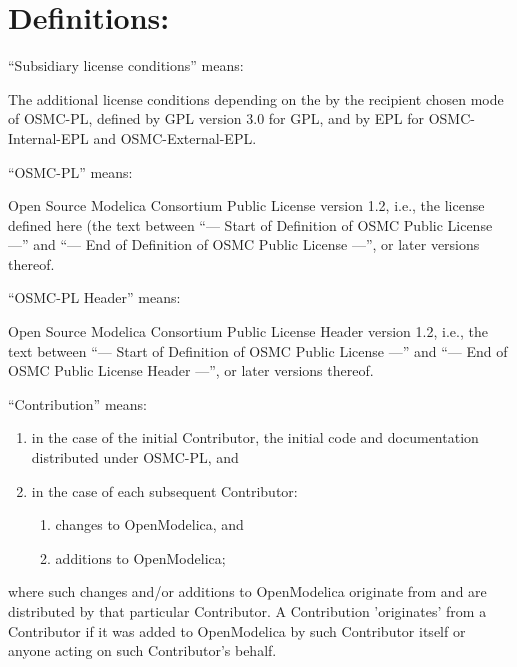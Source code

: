 \documentclass[a4paper, 12pt]{article}
\begin{document}
\section*{Definitions:}

``Subsidiary license conditions'' means:

The additional license conditions depending on the by the recipient chosen mode of OSMC-PL, defined by GPL version 3.0 for GPL, and by EPL for OSMC-Internal-EPL and OSMC-External-EPL.

\vspace{0.5cm}

``OSMC-PL'' means:

Open Source Modelica Consortium Public License version 1.2, i.e., the license defined here (the text between ``--- Start of Definition of OSMC Public License ---'' and ``--- End of Definition of OSMC Public License ---'', or later versions thereof.

\vspace{0.5cm}

``OSMC-PL Header'' means:

Open Source Modelica Consortium Public License Header version 1.2, i.e., the text between ``--- Start of Definition of OSMC Public License ---'' and
``--- End of OSMC Public License Header ---'', or later versions thereof.

\vspace{0.5cm}

``Contribution'' means:

\begin{enumerate}[label=\alph*)]
\item in the case of the initial Contributor, the initial code and documentation distributed under OSMC-PL, and
\item in the case of each subsequent Contributor:\begin{enumerate}[label=\roman*)]
\item changes to OpenModelica, and
\item additions to OpenModelica;
\end{enumerate}
\end{enumerate}
where such changes and/or additions to OpenModelica originate from and are distributed by that particular Contributor. A Contribution 'originates' from a Contributor if it was added to OpenModelica by such Contributor itself or anyone acting on such Contributor's behalf.

\vspace{1cm}
\end{document}
